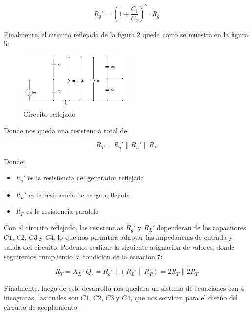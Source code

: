 \begin{equation}
    R_g' = (1 + \frac{C_1}{C_2})^2 \cdot R_g
\end{equation}


Finalmente, el circuito reflejado de la figura 2 queda como se muestra en la figura 5:

\newpage
\begin{figure}[h]
    \centering
    \includegraphics[width=0.5\textwidth]{Imagenes/circuito_reflejado.png}
    \caption{Circuito reflejado}
\end{figure}



Donde nos queda una resistencia total de:

\begin{equation}
    R_T = R_g' \parallel R_L' \parallel R_P
\end{equation}

Donde:

\begin{itemize}
    \item $R_g'$ es la resistencia del generador reflejada
    \item $R_L'$ es la resistencia de carga reflejada
    \item $R_P$ es la resistencia paralelo
\end{itemize}

Con el circuito reflejado, las resistencias $R_g'$ y $R_L'$ dependeran de los capacitores $C1$, $C2$, $C3$ y $C4$, lo que nos permitira adaptar las impedancias de entrada y salida del circuito.
Podemos realizar la siguiente asignacion de valores, donde seguiremos cumpliendo la condicion de la ecuacion 7:

\begin{equation}
    R_T = X_L \cdot Q_c = R_g' \parallel (R_L' \parallel R_P) = 2 R_T \parallel 2 R_T 
\end{equation}

Finalmente, luego de este desarrollo nos quedara un sistema de ecuaciones con 4 incognitas, las cuales son $C1$, $C2$, $C3$ y $C4$, que nos serviran para el diseño del circuito de acoplamiento.


